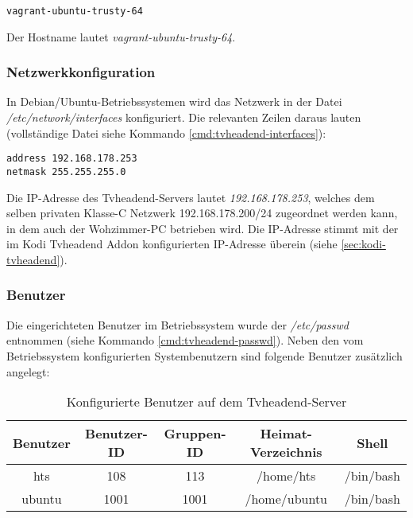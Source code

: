 \begin{cmd}
\begin{verbatim}
vagrant-ubuntu-trusty-64
\end{verbatim}
\caption{icat -o 2048 tvheadend.raw 473}
\end{cmd}

Der Hostname lautet \textit{vagrant-ubuntu-trusty-64}.

\subsubsection{Netzwerkkonfiguration}
\label{sec:tvheadend-network}

In Debian/Ubuntu-Betriebssystemen wird das Netzwerk in der Datei \textit{/etc/network/interfaces} konfiguriert. Die relevanten Zeilen daraus lauten (vollständige Datei siehe Kommando \autoref{cmd:tvheadend-interfaces}):

\begin{verbatim}
address 192.168.178.253
netmask 255.255.255.0
\end{verbatim}

Die IP-Adresse des Tvheadend-Servers lautet \textit{192.168.178.253}, welches dem selben privaten \mbox{Klasse-C} Netzwerk 192.168.178.200/24 zugeordnet werden kann, in dem auch der Wohzimmer-PC betrieben wird. Die IP-Adresse stimmt mit der im Kodi Tvheadend Addon konfigurierten IP-Adresse überein (siehe \autoref{sec:kodi-tvheadend}).

\subsubsection{Benutzer}
\label{sec:tvheadend-users}

Die eingerichteten Benutzer im Betriebssystem wurde der \textit{/etc/passwd} entnommen (siehe Kommando \autoref{cmd:tvheadend-passwd}). Neben den vom Betriebssystem konfigurierten Systembenutzern sind folgende Benutzer zusätzlich angelegt:

\begin{table}[H]
\centering
\begin{tabular}{ccccc}
\toprule
Benutzer & Benutzer-ID & Gruppen-ID & Heimat-Verzeichnis & Shell \\ 
\midrule
hts & 108 & 113 & /home/hts & /bin/bash \\ 
ubuntu & 1001 & 1001 & /home/ubuntu & /bin/bash \\ 
\bottomrule
\end{tabular} 
\caption{Konfigurierte Benutzer auf dem Tvheadend-Server}
\end{table}

